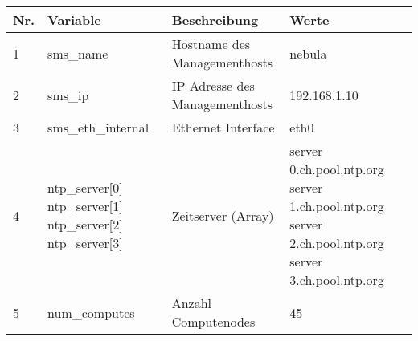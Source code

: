 \begin{longtable}{| p{0.5cm} | p{3cm} | p{8.5cm} | p{4cm} |} 
\hline
\rowcolor{heading} \textbf{Nr.} & \textbf{Variable} & \textbf{Beschreibung} &\textbf{Werte} \\\hline
1 & sms\_name & Hostname des Managementhosts & nebula \\\hline
2 & sms\_ip & IP Adresse des Managementhosts & 192.168.1.10 \\\hline
3 & sms\_eth\_internal & Ethernet Interface & eth0 \\\hline
4 & ntp\_server[0] \newline ntp\_server[1] \newline ntp\_server[2] \newline ntp\_server[3] & Zeitserver (Array) & server 0.ch.pool.ntp.org \newline server 1.ch.pool.ntp.org \newline server 2.ch.pool.ntp.org \newline server 3.ch.pool.ntp.org  \\\hline
5 & num\_computes & Anzahl Computenodes & 45 \\\hline

\end{longtable}
